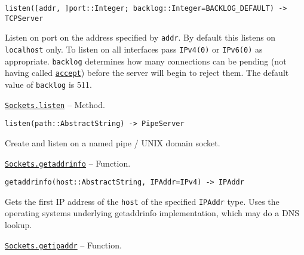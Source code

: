 \begin{adjustwidth}{2em}{0pt}


\begin{verbatim}
listen([addr, ]port::Integer; backlog::Integer=BACKLOG_DEFAULT) -> TCPServer
\end{verbatim}

Listen on port on the address specified by \texttt{addr}. By default this listens on \texttt{localhost} only. To listen on all interfaces pass \texttt{IPv4(0)} or \texttt{IPv6(0)} as appropriate. \texttt{backlog} determines how many connections can be pending (not having called \hyperlink{1426793569216032849}{\texttt{accept}}) before the server will begin to reject them. The default value of \texttt{backlog} is 511.



\end{adjustwidth}
\hypertarget{10346115046291513570}{} 
\hyperlink{10346115046291513570}{\texttt{Sockets.listen}}  -- {Method.}

\begin{adjustwidth}{2em}{0pt}


\begin{verbatim}
listen(path::AbstractString) -> PipeServer
\end{verbatim}

Create and listen on a named pipe / UNIX domain socket.



\end{adjustwidth}
\hypertarget{10301989504197190983}{} 
\hyperlink{10301989504197190983}{\texttt{Sockets.getaddrinfo}}  -- {Function.}

\begin{adjustwidth}{2em}{0pt}


\begin{verbatim}
getaddrinfo(host::AbstractString, IPAddr=IPv4) -> IPAddr
\end{verbatim}

Gets the first IP address of the \texttt{host} of the specified \texttt{IPAddr} type. Uses the operating system{\textquotesingle}s underlying getaddrinfo implementation, which may do a DNS lookup.



\end{adjustwidth}
\hypertarget{11265435361532665287}{} 
\hyperlink{11265435361532665287}{\texttt{Sockets.getipaddr}}  -- {Function.}


